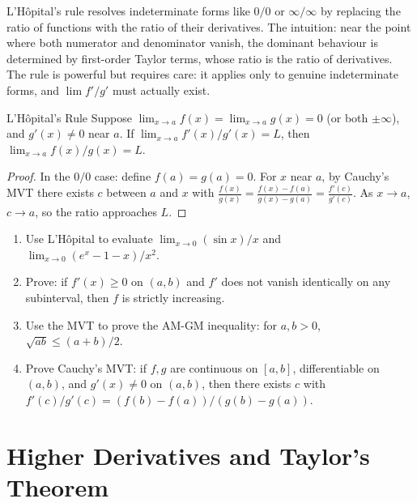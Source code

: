 \documentclass[12pt, openany]{book}
\theoremstyle{plain}
\theoremstyle{definition}
\theoremstyle{remark}
\begin{document}
L'H\^opital's rule resolves indeterminate forms like $0/0$ or $\infty/\infty$ by replacing the ratio of functions with the ratio of their derivatives.  The intuition: near the point where both numerator and denominator vanish, the dominant behaviour is determined by first-order Taylor terms, whose ratio is the ratio of derivatives.  The rule is powerful but requires care: it applies only to genuine indeterminate forms, and $\lim f'/g'$ must actually exist.

\begin{thmbox}{L'H\^opital's Rule}
Suppose $\lim_{x \to a} f(x) = \lim_{x \to a} g(x) = 0$ (or both $\pm\infty$), and $g'(x) \neq 0$ near $a$. If $\lim_{x\to a} f'(x)/g'(x) = L$, then $\lim_{x \to a} f(x)/g(x) = L$.
\end{thmbox}
\color{black}

\begin{proof}
In the $0/0$ case: define $f(a) = g(a) = 0$. For $x$ near $a$, by Cauchy's MVT there exists $c$ between $a$ and $x$ with $\frac{f(x)}{g(x)} = \frac{f(x)-f(a)}{g(x)-g(a)} = \frac{f'(c)}{g'(c)}$. As $x \to a$, $c \to a$, so the ratio approaches $L$.
\end{proof}

\begin{exbox}
\begin{enumerate}
  \item Use L'H\^opital to evaluate $\lim_{x \to 0} (\sin x)/x$ and $\lim_{x \to 0} (e^x - 1 - x)/x^2$.
  \item Prove: if $f'(x) \geq 0$ on $(a,b)$ and $f'$ does not vanish identically on any subinterval, then $f$ is strictly increasing.
  \item Use the MVT to prove the AM-GM inequality: for $a, b > 0$, $\sqrt{ab} \leq (a+b)/2$.
  \item Prove Cauchy's MVT: if $f, g$ are continuous on $[a,b]$, differentiable on $(a,b)$, and $g'(x) \neq 0$ on $(a,b)$, then there exists $c$ with $f'(c)/g'(c) = (f(b)-f(a))/(g(b)-g(a))$.
\end{enumerate}
\end{exbox}
\color{black}

\chapter{Higher Derivatives and Taylor's Theorem}
\color{black}
\end{document}
